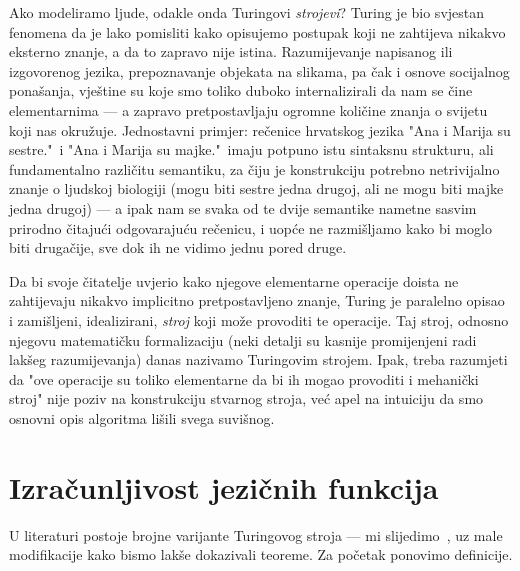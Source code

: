 Ako modeliramo ljude, odakle onda Turingovi \emph{strojevi}? Turing je bio svjestan fenomena da je lako pomisliti kako opisujemo postupak koji ne zahtijeva nikakvo eksterno znanje, a da to zapravo nije istina. Razumijevanje napisanog ili izgovorenog jezika, prepoznavanje objekata na slikama, pa čak i osnove socijalnog ponašanja, vještine su koje smo toliko duboko internalizirali da nam se čine elementarnima --- a zapravo pretpostavljaju ogromne količine znanja o svijetu koji nas okružuje. Jednostavni primjer: rečenice hrvatskog jezika "Ana i Marija su sestre."\ i "Ana i Marija su majke."\ imaju potpuno istu sintaksnu strukturu, ali fundamentalno različitu semantiku, za čiju je konstrukciju potrebno netrivijalno znanje o ljudskoj biologiji (mogu biti sestre jedna drugoj, ali ne mogu biti majke jedna drugoj) --- a ipak nam se svaka od te dvije semantike nametne sasvim prirodno čitajući odgovarajuću rečenicu, i uopće ne razmišljamo kako bi moglo biti drugačije, sve dok ih ne vidimo jednu pored druge.

Da bi svoje čitatelje uvjerio kako njegove elementarne operacije doista ne zahtijevaju nikakvo implicitno pretpostavljeno znanje, Turing je paralelno opisao i zamišljeni, idealizirani, \emph{stroj} koji može provoditi te operacije. Taj stroj, odnosno njegovu matematičku formalizaciju (neki detalji su kasnije promijenjeni radi lakšeg razumijevanja) danas nazivamo Turingovim strojem. Ipak, treba razumjeti da "ove operacije su toliko elementarne da bi ih mogao provoditi i mehanički stroj" nije poziv na konstrukciju stvarnog stroja, već apel na intuiciju da smo osnovni opis algoritma lišili svega suvišnog.

\section{Izračunljivost jezičnih funkcija}\label{sec:tikp}

U literaturi postoje brojne varijante Turingovog stroja --- mi slijedimo~\cite{sipser}, uz male modifikacije kako bismo lakše dokazivali teoreme. Za početak ponovimo definicije.


